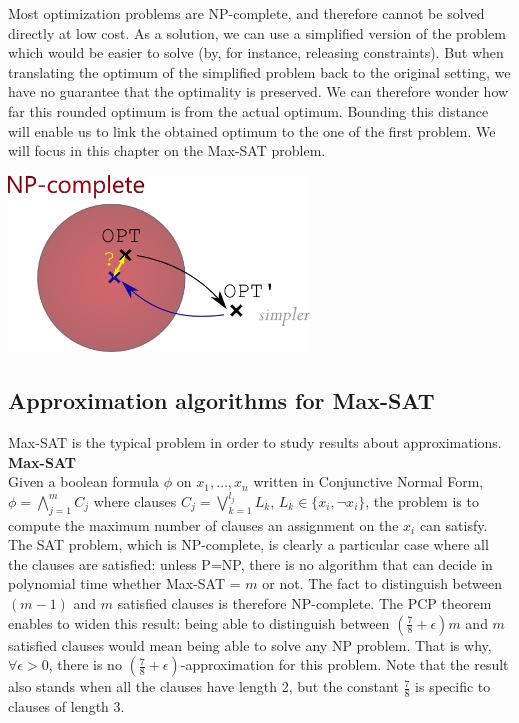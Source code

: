 
Most optimization problems are NP-complete, and therefore cannot be solved directly
at low cost. As a solution, we can use a simplified version of the problem which
would be easier to solve (by, for instance, releasing constraints). But when
translating the optimum of the simplified problem back to the original setting, we
have no guarantee that the optimality is preserved. We can therefore wonder how far
this rounded optimum is from the actual optimum. Bounding this distance will enable
us to link the obtained optimum to the one of the first problem. We will focus in
this chapter on the Max-SAT problem.\\

\begin{center}
 \includegraphics[width=0.6\textwidth]{Figures/img1}
\end{center}



\subsection{Approximation algorithms for Max-SAT}
Max-SAT is the typical problem in order to study results about approximations.\\

\textbf{Max-SAT}\\
Given a boolean formula $\phi$ on $x_1, \dots, x_n$ written in Conjunctive Normal
Form, $\displaystyle \phi = \bigwedge_{j=1}^m{C_j}$ where clauses $\displaystyle
C_j=\bigvee_{k=1}^{l_j}{L_k}$,
$L_k\in \{x_i, \neg x_i\}$, the problem is to compute the maximum number of clauses
an assignment on the $x_i$ can satisfy.\\

The SAT problem, which is NP-complete, is clearly a particular case where all the
clauses are satisfied: unless P=NP, there is no algorithm that can decide in polynomial time
whether Max-SAT = $m$ or not. The fact to distinguish between $(m-1)$ and $m$
satisfied clauses is therefore NP-complete. The PCP theorem enables to widen this
result: being able to distinguish between $(\frac{7}{8}+\epsilon)m$ and $m$
satisfied clauses would mean being able to solve any NP problem. That is why, $\forall\epsilon>0$, there
is no  $(\frac{7}{8}+\epsilon)$-approximation for this problem. Note
that the result also stands when all the clauses have length 2, but the constant
$\frac{7}{8}$ is specific to clauses of length 3.

